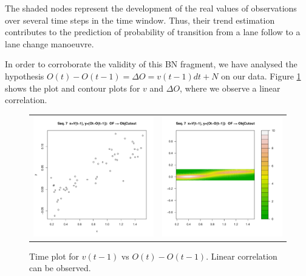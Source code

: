 The shaded nodes represent the development of the real values of observations over several time steps in the time window. Thus, their trend estimation contributes to the prediction of probability of transition from a lane follow to a lane change manoeuvre.

In order to corroborate the validity of this BN fragment, we have analysed the hypothesis $O(t) - O(t-1) = \Delta O = v(t-1)dt +N$ on our data. Figure \ref{Figure:daimlerVvsOffs} shows the plot and contour plots for $v$ and $\Delta O$, where we observe a linear correlation. 

\begin{figure}
  \centering
  \setlength{\tabcolsep}{0.05pt}
  \renewcommand{\arraystretch}{0.02}
    \begin{tabular}{cc}
    \includegraphics[width=60mm]{figures/DaimlerOBJplotSerie7.pdf}&
    \includegraphics[width=60mm]{figures/DaimlerOBJcontourSerie7.pdf}\\
  \end{tabular}
      \caption{ \label{Figure:daimlerVvsOffs}Time plot for $v(t-1)$ vs $O(t) - O(t-1)$. Linear correlation can be observed.}
\end{figure}

